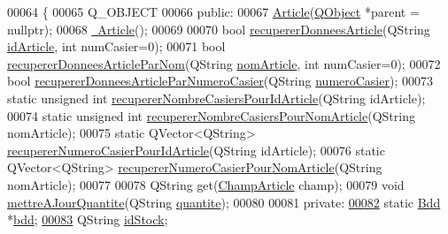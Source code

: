 \begin{DoxyCode}
00064 \{
00065     Q\_OBJECT
00066 \textcolor{keyword}{public}:
00067     \hyperlink{class_article_a27b5b7af25138f7a465215be3a9deca4}{Article}(\hyperlink{class_q_object}{QObject} *parent = \textcolor{keyword}{nullptr});
00068     \hyperlink{class_article_a5c429e49b30104b1069044d0e1a6aa1a}{~Article}();
00069 
00070     \textcolor{keywordtype}{bool} \hyperlink{class_article_ae657464da12790b763659ca98a948f50}{recupererDonneesArticle}(QString \hyperlink{class_article_a9f2f7a04139f26accec145066a5aacae}{idArticle}, \textcolor{keywordtype}{int} numCasier=0);
00071     \textcolor{keywordtype}{bool} \hyperlink{class_article_a6eab145b46f5e1786c5ddf669ffabb6e}{recupererDonneesArticleParNom}(QString 
      \hyperlink{class_article_a0ba6c08f7dd54e4b7caf673ecd6b41a6}{nomArticle}, \textcolor{keywordtype}{int} numCasier=0);
00072     \textcolor{keywordtype}{bool} \hyperlink{class_article_a5d8241c703f142bbc8b011f867fd953f}{recupererDonneesArticleParNumeroCasier}(QString 
      \hyperlink{class_article_a4b8dd9598cc16200c60c7f55196fc26d}{numeroCasier});
00073     \textcolor{keyword}{static} \textcolor{keywordtype}{unsigned} \textcolor{keywordtype}{int} \hyperlink{class_article_a537f0aa471a7466425b6abf6c34058d6}{recupererNombreCasiersPourIdArticle}(QString 
      idArticle);
00074     \textcolor{keyword}{static} \textcolor{keywordtype}{unsigned} \textcolor{keywordtype}{int} \hyperlink{class_article_acdd796ad55a7fde0c229c8c2df7050cc}{recupererNombreCasiersPourNomArticle}(QString 
      nomArticle);
00075     \textcolor{keyword}{static} QVector<QString> \hyperlink{class_article_aa7aeaee7858b50714e9c022899b9b82d}{recupererNumeroCasierPourIdArticle}(QString 
      idArticle);
00076     \textcolor{keyword}{static} QVector<QString> \hyperlink{class_article_aa311f3d149340622383c418444aa65a4}{recupererNumeroCasierPourNomArticle}(QString 
      nomArticle);
00077 
00078     QString \textcolor{keyword}{get}(\hyperlink{_article_8h_a159354683cfd6e1b578172fbe6490ab6}{ChampArticle} champ);
00079     \textcolor{keywordtype}{void} \hyperlink{class_article_a5777f36d74974ff21e712a9875c2d8bf}{mettreAJourQuantite}(QString \hyperlink{class_article_a0870104453080b43bc271346217a864b}{quantite});
00080 
00081 \textcolor{keyword}{private}:
\hyperlink{class_article_a7221cec4212d86d74f479b9ee683ee8a}{00082}     \textcolor{keyword}{static} \hyperlink{class_bdd}{Bdd} *\hyperlink{class_article_a7221cec4212d86d74f479b9ee683ee8a}{bdd};        
\hyperlink{class_article_afb7785930598d5fbdafb707acdd3eec1}{00083}     QString \hyperlink{class_article_afb7785930598d5fbdafb707acdd3eec1}{idStock};        

\end{DoxyCode}
